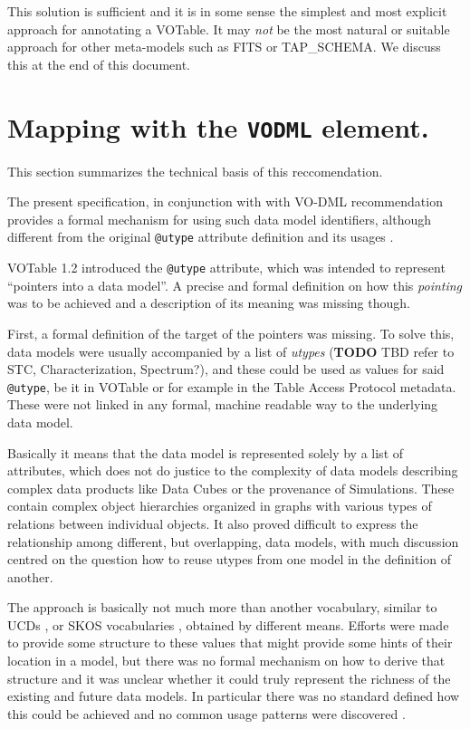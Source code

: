 \documentclass[11pt,a4paper]{ivoa}
\begin{document}
This solution is sufficient and it is in some sense the simplest and
most explicit approach for annotating a VOTable. It may \emph{not} be
the most natural or suitable approach for other meta-models such as FITS
or TAP\_SCHEMA. We discuss this at the end of this document.

\section{Mapping with the \texttt{VODML}
element.}\label{mapping-with-the-vodml-element.}

This section summarizes the technical basis of this reccomendation.

The present specification, in conjunction with with VO-DML
recommendation \cite{2018ivoa.spec.0910L} provides a formal mechanism for using such
data model identifiers, although different from the original
\texttt{@utype} attribute definition and its usages \cite{note:utypeusage}.

VOTable 1.2 introduced the \texttt{@utype} attribute, which was intended
to represent ``pointers into a data model''. A precise and formal
definition on how this \emph{pointing} was to be achieved and a
description of its meaning was missing though.

First, a formal definition of the target of the pointers was missing. To
solve this, data models were usually accompanied by a list of
\emph{utypes} (\textbf{TODO} TBD refer to STC, Characterization,
Spectrum?), and these could be used as values for said
\texttt{@utype}, be it in VOTable or for example in the Table Access
Protocol metadata. These were not linked in any formal, machine readable
way to the underlying data model.

Basically it means that the data model is represented solely by a list
of attributes, which does not do justice to the complexity of data
models describing complex data products like Data Cubes or the
provenance of Simulations. These contain complex object hierarchies
organized in graphs with various types of relations between individual
objects. It also proved difficult to express the relationship among
different, but overlapping, data models, with much discussion centred on
the question how to reuse utypes from one model in the definition of
another.

The approach is basically not much more than another vocabulary, similar
to UCDs \cite{2018ivoa.spec.0527M}, or SKOS vocabularies \cite{2009ivoa.spec.1007G}, obtained by
different means. Efforts were made to provide some structure to these
values that might provide some hints of their location in a model, but
there was no formal mechanism on how to derive that structure and it was
unclear whether it could truly represent the richness of the existing
and future data models. In particular there was no standard defined how
this could be achieved and no common usage patterns were discovered
\cite{note:utypeusage}.
\end{document}
